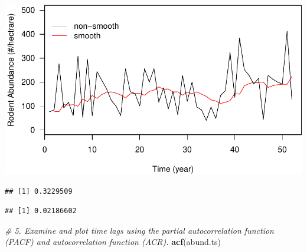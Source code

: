 \documentclass[]{article}
\newenvironment{Shaded}{\begin{snugshade}}{\end{snugshade}}
\newcommand{\KeywordTok}[1]{\textcolor[rgb]{0.13,0.29,0.53}{\textbf{{#1}}}}
\newcommand{\DataTypeTok}[1]{\textcolor[rgb]{0.13,0.29,0.53}{{#1}}}
\newcommand{\StringTok}[1]{\textcolor[rgb]{0.31,0.60,0.02}{{#1}}}
\newcommand{\CommentTok}[1]{\textcolor[rgb]{0.56,0.35,0.01}{\textit{{#1}}}}
\newcommand{\NormalTok}[1]{{#1}}
\begin{document}
\includegraphics{temporal_assignment_files/figure-latex/unnamed-chunk-4-3.pdf}

\begin{Shaded}
\end{Shaded}

\begin{verbatim}
## [1] 0.3229509
\end{verbatim}

\begin{Shaded}
\end{Shaded}

\begin{verbatim}
## [1] 0.02186602
\end{verbatim}

\begin{Shaded}
\begin{Highlighting}[]
\CommentTok{#  5. Examine and plot time lags using the partial autocorrelation function (PACF) and autocorrelation function (ACR).}
\KeywordTok{acf}\NormalTok{(abund.ts)}
\end{Highlighting}
\end{Shaded}
\end{document}
